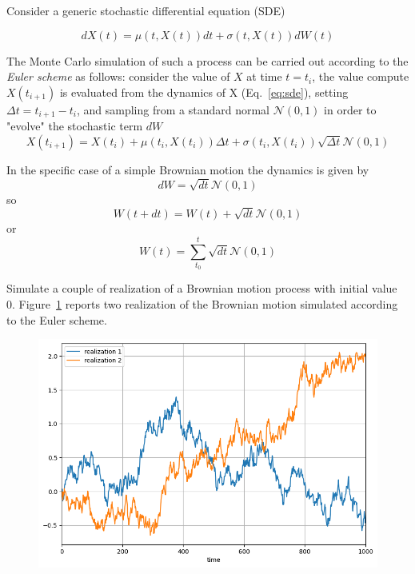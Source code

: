 \documentclass[12pt,a4paper]{article}
\begin{document}
Consider a generic stochastic differential equation (SDE)

\begin{equation}
dX(t) = \mu(t,X(t))dt + \sigma(t,X(t))dW(t)
\label{eq:sde}
\end{equation}

The Monte Carlo simulation of such a process can be carried out according to the \emph{Euler scheme} as follows: consider the value of $X$ at time $t=t_i$, the value compute $X(t_{i+1})$ is evaluated from the dynamics of X (Eq.~\ref{eq:sde}), setting $\Delta t = t_{i+1} - t_{i}$, and sampling from a standard normal $\mathcal{N}(0,1)$ in order to "evolve" the stochastic term $dW$
\begin{equation}
X(t_{i+1}) = X(t_i) + \mu(t_i,X(t_i))\Delta t + \sigma(t_i,X(t_i))\sqrt{\Delta t}\mathcal{N}(0,1)
\end{equation}

In the specific case of a simple Brownian motion the dynamics is given by
\begin{equation}
dW = \sqrt{dt}\mathcal{N}(0,1)
\end{equation}
so
\begin{equation}
W(t+dt) = W(t) + \sqrt{dt}\mathcal{N}(0,1)
\end{equation}
or
\begin{equation}
W(t) = \sum_{t_0}^{t} \sqrt{dt}\mathcal{N}(0,1)
\end{equation}

\begin{question}
Simulate a couple of realization of a Brownian motion process with initial value 0.
Figure~\ref{fig:brownian_motion} reports two realization of the Brownian motion simulated according to the Euler scheme.

\begin{figure}[htbp]
\begin{center}
\includegraphics[width=0.5\linewidth]{addons/brownian_motion}
\end{center}
\label{fig:brownian_motion}
\end{figure}
\end{question}
\end{document}

